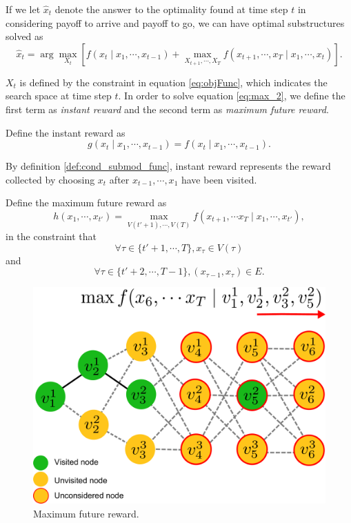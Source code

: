 If we let $ \hat{x}_{t} $ denote the answer to the optimality found at time step $ t $ in considering payoff to arrive and payoff to go,  we can have optimal substructures solved as 
\begin{equation}
\label{eq:max_2}
\hat{x}_{t} = \arg \max_{X_{t}} \left[ f(x_{t} \mid x_{1} , \cdots , x_{t-1})
+ \max_{X_{t+1}, \cdots , X_{T}} f(x_{t+1}, \cdots , x_{T} \mid x_{1}, \cdots , x_{t})
\right].
\end{equation}

$ X_{t} $ is defined by the constraint in equation \eqref{eq:objFunc}, which indicates the search space at time step $ t $.
In order to solve equation \eqref{eq:max_2}, we define the first term as \emph{instant reward} and the second term as \emph{maximum future reward}.

\begin{mydef}
\label{def:instant_reward}
Define the instant reward as 
\begin{equation}
\label{eq:def_g}
g(x_{t} \mid x_{1} , \cdots , x_{t-1} ) = f(x_{t} \mid x_{1} , \cdots , x_{t-1}). 
\end{equation}
\end{mydef}

By definition \ref{def:cond_submod_func}, instant reward represents the reward collected by choosing $ x_{t} $ after $ x_{t-1} , \cdots , x_{1} $ have been visited.

\begin{mydef}
\label{def:max_future_reward}
Define the maximum future reward as
\begin{equation}
\label{eq:def_h}
h(x_{1} , \cdots, x_{t'} ) = \max_{V(t'+1), \cdots , V(T)} f(x_{t+1}, \cdots x_{T} \mid x_{1}, \cdots , x_{t'}),
\end{equation} 
in the constraint that
\begin{equation}
\label{eq:def_h:constraint1}
\forall \tau \in \{ t'+1 , \cdots , T \},  x_{\tau} \in V(\tau)
\end{equation}
and
\begin{equation}
\label{eq:def_h:constraint2}
\forall \tau \in \{ t'+2, \cdots ,T-1 \}, ( x_{\tau-1}, x_{\tau} ) \in E .
\end{equation}
\end{mydef}

\begin{figure}
\centering
\includegraphics[width=0.5\linewidth]{./images/DefineFuncH.pdf}
\caption{Maximum future reward.}
\label{fig:DefineFuncH}
\end{figure}

